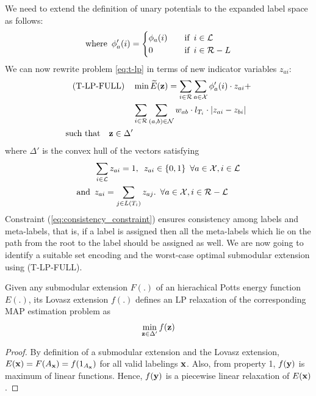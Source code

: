 {We need to extend the definition of unary potentials to the expanded label space as follows:
\begin{align}
    \text{where} \enskip    \phi'_{a}(i) =  \begin{cases} 
        \phi_{a}(i) \quad &\text{if} \enskip i \in {\mathcal L} \\
        0  \quad &\text{if} \enskip i \in {\mathcal R - L} \\
    \end{cases}
\end{align}
%
We can now rewrite problem \eqref{eq:t-lp} in terms of new indicator variables $z_{ai}$:
%
\begin{align}
    \text{(T-LP-FULL)} \quad &\min \widetilde{E}({\bf z}) = \sum_{i \in \mathcal{R}} \sum_{a \in {\mathcal X}} \phi_a'(i) \cdot z_{ai} + \nonumber \\
            &\sum_{i \in \mathcal{R}} \sum_{(a, b) \in {\mathcal N}} w_{ab} \cdot l_{T_i} \cdot |z_{ai} - z_{bi}| \nonumber \\
    \text{such that} \quad {\bf z} \in \Delta'
\end{align}
   where $\Delta'$ is the convex hull of the vectors satisfying
\begin{align}
    \enskip &\sum_{i \in \mathcal{L}} z_{ai} = 1, \enskip z_{ai} \in \{0, 1\} \enskip \forall a \in {\mathcal X}, i \in \mathcal{L} \\
    \text{and} \enskip &z_{ai} = \sum_{j \in L(T_i) } z_{aj}.\enskip \forall a \in {\mathcal X}, i \in \mathcal{R - L} %
\end{align}
%
Constraint (\ref{eq:consistency_constraint}) ensures consistency among labels and meta-labels, that is, if a label is assigned then all the meta-labels which lie on the path from the root to the label should be assigned as well. We are now going to identify a suitable set encoding and the worst-case optimal submodular extension using (T-LP-FULL).


{\lemma Given any submodular extension $F(.)$ of an hierachical Potts energy function $E(.)$, its Lovasz extension $f(.)$ defines an LP relaxation of the corresponding MAP estimation problem as
\begin{align}
    \min_{{\bf z} \in \Delta'} f({\bf z}) 
\end{align}

\begin{proof}
    By definition of a submodular extension and the Lovasz extension, $E({\bf x}) = F(A_{\bf x}) = f(1_{A_{\bf x}})$ for all valid labelings ${\bf x}$. Also, from property 1, $f({\bf y})$ is maximum of linear functions. Hence, $f({\bf y})$ is a piecewise linear relaxation of $E({\bf x})$.


\end{proof}}}
